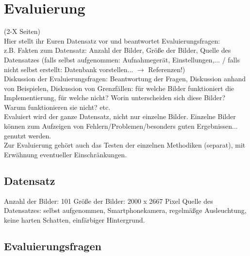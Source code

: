 \documentclass[paper=A4, deutsch]{scrartcl}
\begin{document}
\section{Evaluierung}
(2-X Seiten)\\
Hier stellt ihr Euren Datensatz vor und beantwortet Evaluierungsfragen:\\
z.B. Fakten zum Datensatz: Anzahl der Bilder, Größe der Bilder, Quelle des Datensatzes (falls selbst aufgenommen: Aufnahmegerät, Einstellungen,... / falls nicht selbst erstellt: Datenbank vorstellen... $\to$ Referenzen!)\\
Diskussion der Evaluierungsfragen: Beantwortung der Fragen, Diskussion anhand von Beispielen, Diskussion von Grenzfällen: für welche Bilder funktioniert die Implementierung, für welche nicht? Worin unterscheiden sich diese Bilder? Warum funktionieren sie nicht? etc.\\
Evaluiert wird der ganze Datensatz, nicht nur einzelne Bilder. Einzelne Bilder können zum Aufzeigen von Fehlern/Problemen/besonders guten Ergebnissen... genutzt werden.\\
Zur Evaluierung gehört auch das Testen der einzelnen Methodiken (separat), mit Erwähnung eventueller Einschränkungen.

\subsection{Datensatz}
Anzahl der Bilder: 101
Größe der Bilder: 2000 x 2667 Pixel
Quelle des Datensatzes: selbst aufgenommen, Smartphonekamera, regelmäßge Ausleuchtung, keine harten Schatten, einfärbiger Hintergrund.\\

\subsection{Evaluierungsfragen}
\end{document}
